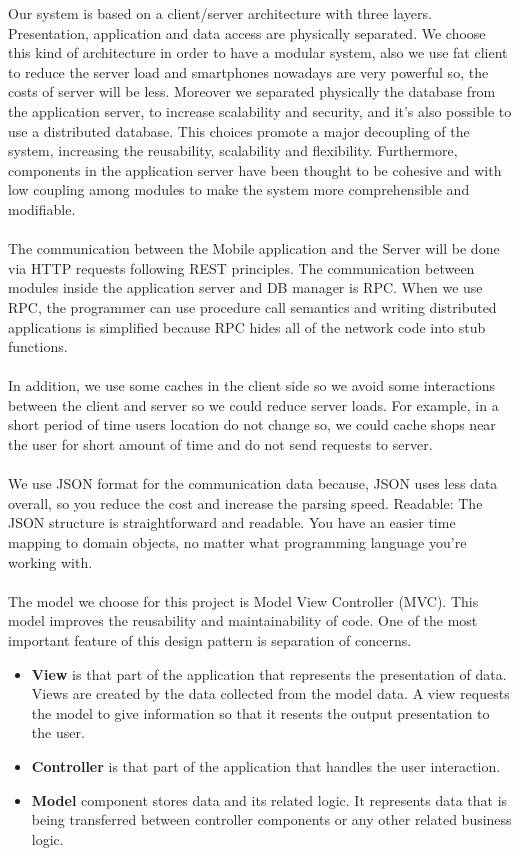 \vspace{1cm}
 Our system is based on a client/server architecture with three layers. Presentation, application and data access are physically separated. We choose this kind of architecture in order to have a modular system, also we use fat client to reduce the server load and smartphones nowadays are very powerful so, the costs of server will be less. Moreover we separated physically the database from the application server, to increase scalability and security, and it’s also possible to use a distributed database. This choices promote a major decoupling of the system, increasing the reusability, scalability and flexibility. Furthermore, components in the application server have been thought to be cohesive and with low coupling among modules to make the system more comprehensible and modifiable. \\ \\
 The communication between the Mobile application and the Server will be done via HTTP requests following REST principles. The communication between modules inside the application server and DB manager is RPC. When we use RPC, the programmer can use procedure call semantics and writing distributed applications is simplified because RPC hides all of the network code into stub functions.\\ \\
 In addition, we use some caches in the client side so we avoid some interactions between the client and server so we could reduce server loads. For example, in a short period of time users location do not change so, we could cache shops near the user for short amount of time and do not send requests to server.\\ \\
 We use JSON format for the communication data because, JSON uses less data overall, so you reduce the cost and increase the parsing speed. Readable: The JSON structure is straightforward and readable. You have an easier time mapping to domain objects, no matter what programming language you're working with.\\ \\
 The model we choose for this project is Model View Controller (MVC). This model improves the reusability and maintainability of code. One of the most important feature of this design pattern is separation of concerns. 
 \begin{itemize}
     \item \textbf{View} is that part of the application that represents the presentation of data. Views are created by the data collected from the model data. A view requests the model to give information so that it resents the output presentation to the user.\\
     
     \item \textbf{Controller} is that part of the application that handles the user interaction.
     
     \item \textbf{Model} component stores data and its related logic. It represents data that is being transferred between controller components or any other related business logic.
     
 \end{itemize}
